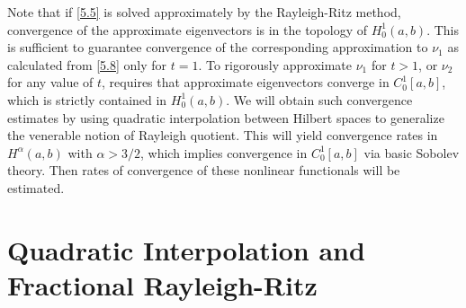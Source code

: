 \documentclass[final]{siamltex}
\numberwithin{equation}{section}
\begin{document}
Note that if \eqref{5.5} is solved approximately by the Rayleigh-Ritz method, convergence of the approximate eigenvectors is in the topology of $H_0^1(a,b)$. This is sufficient to guarantee convergence of the corresponding approximation to $\nu_1$ as calculated from \eqref{5.8} only for $t=1$. To rigorously approximate $\nu_1$ for $t>1$, or $\nu_2$ for any value of $t$, requires that approximate eigenvectors converge in $C_0^1[a,b]$, which is strictly contained in $H_0^1(a,b)$. We will obtain such convergence estimates by using quadratic interpolation between Hilbert spaces to generalize the venerable notion of Rayleigh quotient. This will yield convergence rates in $H^{\alpha}(a,b)$ with $\alpha >3/2$, which implies convergence in $C_0^1[a,b]$ via basic Sobolev theory. Then rates of convergence of these nonlinear functionals will be estimated.

\section{Quadratic Interpolation and Fractional Rayleigh-Ritz} \label{quadratic-interpolation}
\end{document}
